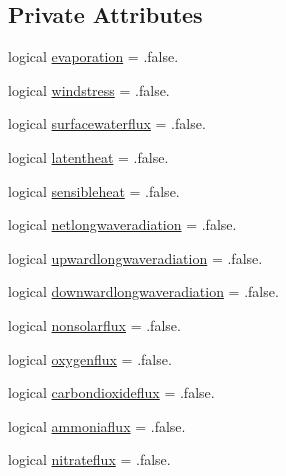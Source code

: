 \subsection*{Private Attributes}
\begin{DoxyCompactItemize}
\item 
logical \mbox{\hyperlink{structmoduleinterfacewaterair_1_1t__int__options_aad5ac5ea1b953d85bf789f3339b2c21d}{evaporation}} = .false.
\item 
logical \mbox{\hyperlink{structmoduleinterfacewaterair_1_1t__int__options_a9779d36a8e18c99428a9d6c17d471de2}{windstress}} = .false.
\item 
logical \mbox{\hyperlink{structmoduleinterfacewaterair_1_1t__int__options_a3a0c0d31b1c4e599d4f219a72e5fbcfd}{surfacewaterflux}} = .false.
\item 
logical \mbox{\hyperlink{structmoduleinterfacewaterair_1_1t__int__options_a391428051d89caae00b4335d0575a84e}{latentheat}} = .false.
\item 
logical \mbox{\hyperlink{structmoduleinterfacewaterair_1_1t__int__options_ac0e23d517fc078e85fa44cab0722b2ce}{sensibleheat}} = .false.
\item 
logical \mbox{\hyperlink{structmoduleinterfacewaterair_1_1t__int__options_a701af2261c2468d22dbdfc1f65de205e}{netlongwaveradiation}} = .false.
\item 
logical \mbox{\hyperlink{structmoduleinterfacewaterair_1_1t__int__options_a3524eceaf5b943e1f966a58590fe036d}{upwardlongwaveradiation}} = .false.
\item 
logical \mbox{\hyperlink{structmoduleinterfacewaterair_1_1t__int__options_a7c78be874bae75870ecf8b74a6f562e0}{downwardlongwaveradiation}} = .false.
\item 
logical \mbox{\hyperlink{structmoduleinterfacewaterair_1_1t__int__options_a33b06092c9f49325292bc02ca66b4cb5}{nonsolarflux}} = .false.
\item 
logical \mbox{\hyperlink{structmoduleinterfacewaterair_1_1t__int__options_aeb33e7a514950186080ac6aaa0399562}{oxygenflux}} = .false.
\item 
logical \mbox{\hyperlink{structmoduleinterfacewaterair_1_1t__int__options_acc3550d4dc2fc1f586824abb94afea0f}{carbondioxideflux}} = .false.
\item 
logical \mbox{\hyperlink{structmoduleinterfacewaterair_1_1t__int__options_a2ea4e7eb5ca7f9f1350ba31fc6c6bea2}{ammoniaflux}} = .false.
\item 
logical \mbox{\hyperlink{structmoduleinterfacewaterair_1_1t__int__options_a2f46ae9de8e677f21326423c70608211}{nitrateflux}} = .false.

\end{DoxyCompactItemize}
